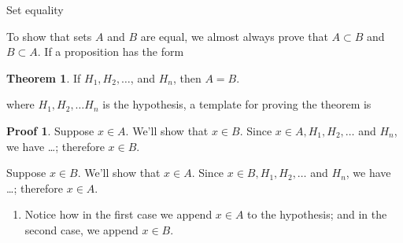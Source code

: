 \documentclass[fleqn]{beamer}
\theoremstyle{definition}
\newtheorem{myth}{Theorem}
\newtheorem{myproof}{Proof}
\begin{document}
\begin{frame}{Set equality}

To show that sets \(A\) and \(B\) are equal, we almost always prove that \(A \subset B\) and \(B \subset A\).  If a proposition has the form

\begin{myth} If \(H_1, H_2, \dots\), and \( H_n\), then \(A = B\). \end{myth}

where  \(H_1, H_2, \dots H_n\) is the hypothesis, a template for proving the theorem is
\begin{myproof} Suppose \(x \in A\).  We'll show that \(x \in B\).  Since  \(x \in A, H_1, H_2, \dots\) and \( H_n\),  we have \dots; therefore \(x \in B\).

\quad Suppose \(x \in B\).  We'll show that \(x \in A\).  Since  \(x \in B, H_1, H_2, \dots\) and  \(H_n\),  we have \dots; therefore \(x \in A\).

\end{myproof}

\begin{enumerate}

\item Notice how in the first case we append \(x \in A\) to the hypothesis; and in the second case, we append \(x \in B\).
\end{enumerate}

\end{frame}
\end{document}
